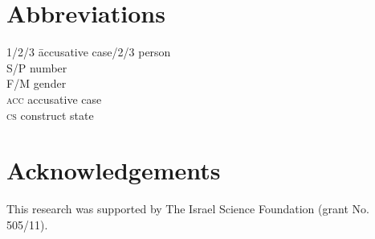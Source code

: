 \documentclass[output=paper]{langsci/langscibook}
\begin{document}
\section*{Abbreviations}
\begin{multicols}{2}
\begin{tabbing}
1/2/3 \hspace{1em} \= accusative case/2/3 \> person\\
S/P   \> number\\
F/M   \> gender\\
\textsc{acc}\> accusative case \\
\textsc{cs} \> construct state \\
\end{tabbing}
\end{multicols}

\section*{Acknowledgements}
This research was supported by The Israel Science Foundation (grant No. 505/11).


\printbibliography[heading=subbibliography,notkeyword=this]
\end{document}
